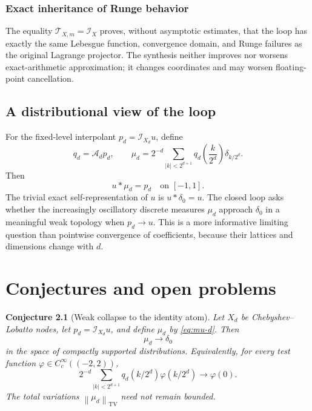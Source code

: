 \documentclass[11pt,oneside]{book}
\newtheorem{conjecture}[theorem]{Conjecture}
\theoremstyle{definition}
\theoremstyle{remark}
\newcommand{\Iop}{\mathcal I}
\newcommand{\Aop}{\mathcal A}
\newcommand{\Top}{\mathcal T}
\newcommand{\norm}[1]{\left\lVert#1\right\rVert}
\begin{document}
\subsection{Exact inheritance of Runge behavior}
The equality \(\Top_{X,m}=\Iop_X\) proves, without asymptotic estimates, that the loop has exactly the same Lebesgue function, convergence domain, and Runge failures as the original Lagrange projector.  The synthesis neither improves nor worsens exact-arithmetic approximation; it changes coordinates and may worsen floating-point cancellation.

\section{A distributional view of the loop}
For the fixed-level interpolant \(p_d=\Iop_{X_d}u\), define
\begin{equation}
 q_d=\Aop_dp_d,
 \qquad
 \mu_d=2^{-d}\sum_{|k|<2^{d+1}}
 q_d\!\left(\frac{k}{2^d}\right)\delta_{k/2^d}.
 \label{eq:mu-d}
\end{equation}
Then
\begin{equation}
 u*\mu_d=p_d\quad\text{on }[-1,1].
 \label{eq:u-mu-p}
\end{equation}
The trivial exact self-representation of \(u\) is \(u*\delta_0=u\).  The closed loop asks whether the increasingly oscillatory discrete measures \(\mu_d\) approach \(\delta_0\) in a meaningful weak topology when \(p_d\to u\).  This is a more informative limiting question than pointwise convergence of coefficients, because their lattices and dimensions change with \(d\).

\chapter{Conjectures and open problems}
\label{ch:conjectures}

\begin{conjecture}[Weak collapse to the identity atom]
\label{conj:delta-limit}
Let \(X_d\) be Chebyshev--Lobatto nodes, let \(p_d=\Iop_{X_d}u\), and define \(\mu_d\) by \cref{eq:mu-d}.  Then
\begin{equation}
 \mu_d\longrightarrow\delta_0
 \label{eq:delta-limit}
\end{equation}
in the space of compactly supported distributions.  Equivalently, for every test function \(\varphi\in C_c^\infty((-2,2))\),
\[
 2^{-d}\sum_{|k|<2^{d+1}}
 q_d(k/2^d)\varphi(k/2^d)\longrightarrow\varphi(0).
\]
The total variations \(\norm{\mu_d}_{\mathrm{TV}}\) need not remain bounded.
\end{conjecture}
\end{document}
